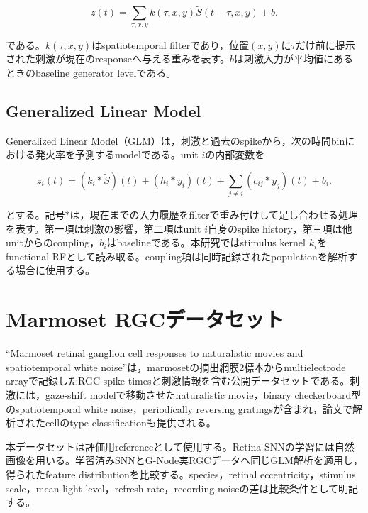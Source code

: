 \documentclass[uplatex,dvipdfmx,a4paper,10pt]{jsarticle}
\begin{document}
\begin{equation}
z(t)
=
\sum_{\tau,x,y}
k(\tau,x,y)\widetilde{S}(t-\tau,x,y)
+
b.
\label{eq:ln_linear_filter}
\end{equation}

である。\(k(\tau,x,y)\)はspatiotemporal filterであり，位置\((x,y)\)に\(\tau\)だけ前に提示された刺激が現在のresponseへ与える重みを表す。\(b\)は刺激入力が平均値にあるときのbaseline generator levelである。
\subsection{Generalized Linear Model}
\label{subsec:glm}

Generalized Linear Model（GLM）は，刺激と過去のspikeから，次の時間binにおける発火率を予測するmodelである\cite{pillow2008glm}。unit \(i\)の内部変数を

\begin{equation}
z_i(t)
=
(k_i * \widetilde{S})(t)
+
(h_i * y_i)(t)
+
\sum_{j\neq i}(c_{ij} * y_j)(t)
+
b_i.
\label{eq:glm_generator}
\end{equation}

とする。記号\(*\)は，現在までの入力履歴をfilterで重み付けして足し合わせる処理を表す。第一項は刺激の影響，第二項はunit \(i\)自身のspike history，第三項は他unitからのcoupling，\(b_i\)はbaselineである。本研究ではstimulus kernel \(k_i\)をfunctional RFとして読み取る。coupling項は同時記録されたpopulationを解析する場合に使用する。



\section{Marmoset RGCデータセット}
\label{sec:marmoset_dataset}

``Marmoset retinal ganglion cell responses to naturalistic movies and spatiotemporal white noise''は，marmosetの摘出網膜2標本からmultielectrode arrayで記録したRGC spike timesと刺激情報を含む公開データセットである\cite{sridhar2025dataset}。刺激には，gaze-shift modelで移動させたnaturalistic movie，binary checkerboard型のspatiotemporal white noise，periodically reversing gratingsが含まれ，論文で解析されたcellのtype classificationも提供される。


本データセットは評価用referenceとして使用する。Retina SNNの学習には自然画像を用いる。学習済みSNNとG-Node実RGCデータへ同じGLM解析を適用し，得られたfeature distributionを比較する。species，retinal eccentricity，stimulus scale，mean light level，refresh rate，recording noiseの差は比較条件として明記する。
\end{document}
